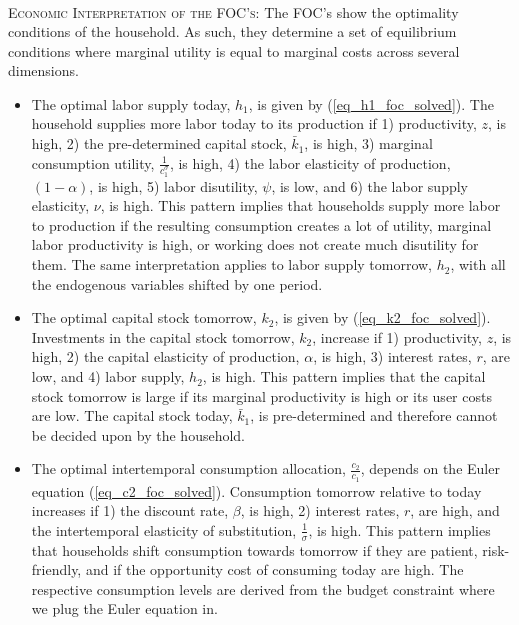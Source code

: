 \documentclass[a4paper, 12pt]{article}
\begin{document}
\begin{Answer}
\begin{align}
		\end{align}
		\textsc{Economic Interpretation of the FOC's:}
		The FOC's show the optimality conditions of the household. As such, they determine a set of equilibrium conditions where marginal utility is equal to marginal costs across several dimensions.
		\begin{itemize}
			\item[$\blacktriangleright$] The optimal labor supply today, $h_1$, is given by (\ref{eq_h1_foc_solved}). The household supplies more labor today to its production if 1) productivity, $z$, is high, 2) the pre-determined capital stock, $\bar{k}_1$, is high, 3) marginal consumption utility, $\frac{1}{c_1^\sigma}$, is high, 4) the labor elasticity of production, $\left(1-\alpha\right)$, is high, 5) labor disutility, $\psi$, is low, and 6) the labor supply elasticity, $\nu$, is high. This pattern implies that households supply more labor to production if the resulting consumption creates a lot of utility, marginal labor productivity is high, or working does not create much disutility for them. The same interpretation applies to labor supply tomorrow, $h_2$, with all the endogenous variables shifted by one period.
			\item[$\blacktriangleright$] The optimal capital stock tomorrow, $k_2$, is given by (\ref{eq_k2_foc_solved}). Investments in the capital stock tomorrow, $k_2$, increase if 1) productivity, $z$, is high, 2) the capital elasticity of production, $\alpha$, is high, 3) interest rates, $r$, are low, and 4) labor supply, $h_2$, is high. This pattern implies that the capital stock tomorrow is large if its marginal productivity is high or its user costs are low. The capital stock today, $\bar{k}_1$, is pre-determined and therefore cannot be decided upon by the household.
			\item[$\blacktriangleright$] The optimal intertemporal consumption allocation, $\frac{c_2}{c_1}$, depends on the Euler equation (\ref{eq_c2_foc_solved}). Consumption tomorrow relative to today increases if 1) the discount rate, $\beta$, is high, 2) interest rates, $r$, are high, and the intertemporal elasticity of substitution, $\frac{1}{\sigma}$, is high. This pattern implies that households shift consumption towards tomorrow if they are patient, risk-friendly, and if the opportunity cost of consuming today are high. The respective consumption levels are derived from the budget constraint where we plug the Euler equation in.
		\end{itemize}
\end{Answer}%
\end{document}

